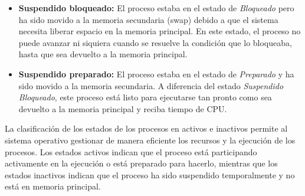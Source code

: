 \begin{tcolorbox}
\begin{itemize}
	\item \textbf{Suspendido bloqueado:} El proceso estaba en el estado de \textit{Bloqueado} pero ha sido movido a la memoria secundaria (swap) debido a que el sistema necesita liberar espacio en la memoria principal. En este estado, el proceso no puede avanzar ni siquiera cuando se resuelve la condición que lo bloqueaba, hasta que sea devuelto a la memoria principal.
	
	
	\item \textbf{Suspendido preparado:} El proceso estaba en el estado de \textit{Preparado} y ha sido movido a la memoria secundaria. A diferencia del estado \textit{Suspendido Bloqueado}, este proceso está listo para ejecutarse tan pronto como sea devuelto a la memoria principal y reciba tiempo de CPU.

\end{itemize}

\end{tcolorbox}

La clasificación de los estados de los procesos en activos e inactivos permite al sistema operativo gestionar de manera eficiente los recursos y la ejecución de los procesos. Los estados activos indican que el proceso está participando activamente en la ejecución o está preparado para hacerlo, mientras que los estados inactivos indican que el proceso ha sido suspendido temporalmente y no está en memoria principal.

\newpage
